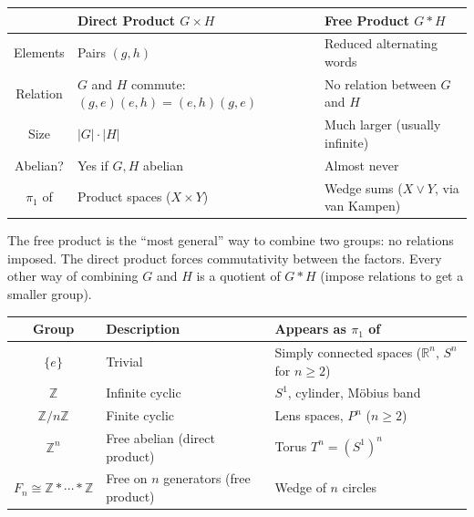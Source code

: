 \documentclass[11pt]{report}
\begin{document}
\begin{rembox}
\begin{center}
\small
\begin{tabular}{|c|p{5cm}|p{5cm}|}
\hline
& \textbf{Direct Product $G \times H$} & \textbf{Free Product $G * H$} \\
\hline
Elements & Pairs $(g, h)$ & Reduced alternating words \\
\hline
Relation & $G$ and $H$ commute: $(g, e)(e, h) = (e, h)(g, e)$ & No relation between $G$ and $H$ \\
\hline
Size & $|G| \cdot |H|$ & Much larger (usually infinite) \\
\hline
Abelian? & Yes if $G, H$ abelian & Almost never \\
\hline
$\pi_1$ of & Product spaces ($X \times Y$) & Wedge sums ($X \vee Y$, via van Kampen) \\
\hline
\end{tabular}
\end{center}
The free product is the ``most general'' way to combine two groups: no relations imposed. The direct product forces commutativity between the factors. Every other way of combining $G$ and $H$ is a quotient of $G * H$ (impose relations to get a smaller group).
\end{rembox}

\begin{rembox}
\begin{center}
\small
\begin{tabular}{|c|p{3.8cm}|p{5.5cm}|}
\hline
\textbf{Group} & \textbf{Description} & \textbf{Appears as $\pi_1$ of} \\
\hline
$\{e\}$ & Trivial & Simply connected spaces ($\mathbb{R}^n$, $S^n$ for $n \geq 2$) \\
\hline
$\mathbb{Z}$ & Infinite cyclic & $S^1$, cylinder, M\"obius band \\
\hline
$\mathbb{Z}/n\mathbb{Z}$ & Finite cyclic & Lens spaces, $P^n$ ($n \geq 2$) \\
\hline
$\mathbb{Z}^n$ & Free abelian (direct product) & Torus $T^n = (S^1)^n$ \\
\hline
$F_n \cong \mathbb{Z} * \cdots * \mathbb{Z}$ & Free on $n$ generators (free product) & Wedge of $n$ circles \\
\hline
\end{tabular}
\end{center}
\end{rembox}
\end{document}
